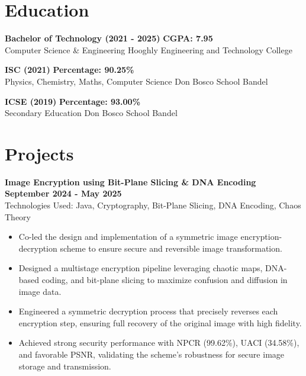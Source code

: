 \documentclass[a4paper,10pt]{article}
\newcommand{\sectionspacing}{\vspace{0.09em}}
\begin{document}
\sectionspacing



\section*{Education}
\textbf{Bachelor of Technology (2021 - 2025)} \hfill {\textbf{CGPA: 7.95}} \\
Computer Science \& Engineering \hfill Hooghly Engineering and Technology College %

\vspace{0.5em}

\textbf{ISC (2021)} \hfill {\textbf{Percentage: 90.25\%}} \\
Physics, Chemistry, Maths, Computer Science \hfill Don Bosco School Bandel

\vspace{0.5em}

\textbf{ICSE (2019)} \hfill {\textbf{Percentage: 93.00\%}} \\
Secondary Education \hfill Don Bosco School Bandel



\sectionspacing

\section*{Projects}
\textbf{Image Encryption using Bit-Plane Slicing \& DNA Encoding} \hfill {\textbf{September 2024 - May 2025}}\\[0.4em]
\vspace{-0.2em}
Technologies Used: Java, Cryptography, Bit-Plane Slicing, DNA Encoding, Chaos Theory

\begin{itemize}[leftmargin=*]
    \item Co-led the design and implementation of a symmetric image encryption-decryption scheme to ensure secure and reversible image transformation.
    \item Designed a multistage encryption pipeline leveraging chaotic maps, DNA-based coding, and bit-plane slicing to maximize confusion and diffusion in image data.
    \item Engineered a symmetric decryption process that precisely reverses each encryption step, ensuring full recovery of the original image with high fidelity.
    \item Achieved strong security performance with NPCR (99.62\%), UACI (34.58\%), and favorable PSNR, validating the scheme's robustness for secure image storage and transmission.
\end{itemize}
\end{document}
